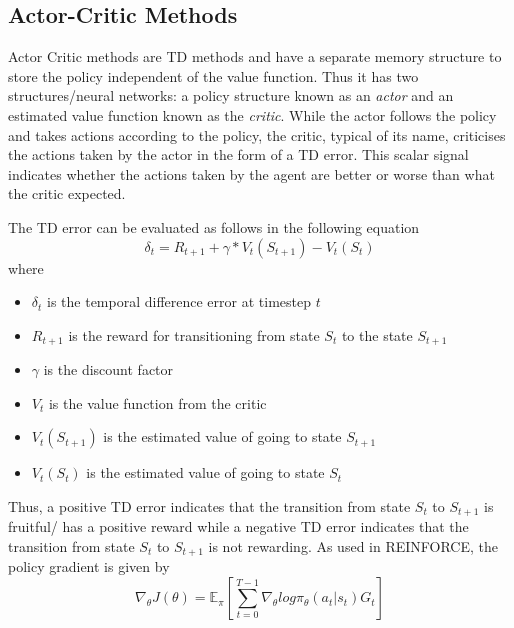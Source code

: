 \documentclass{article}
\begin{document}
\subsection{Actor-Critic Methods}
Actor Critic methods are TD methods and have a separate memory structure to store the policy independent of the value function. Thus it has two structures/neural networks: a policy structure known as an \emph{actor} and an estimated value function known as the \emph{critic}. While the actor follows the policy and takes actions according to the policy, the critic, typical of its name, criticises the actions taken by the actor in the form of a TD error. This scalar signal indicates whether the actions taken by the agent are better or worse than what the critic expected. 
\par The TD error can be evaluated as follows in the following equation
\begin{equation*}
\delta_{t} = R_{t+1} + \gamma * V_t(S_{t+1})-V_t(S_t)
\end{equation*}
 where 
\begin{itemize}[itemsep=0pt]
\renewcommand\labelitemi{.}
\item $\delta_{t}$ is the temporal difference error at timestep $t$
\item $R_{t+1}$ is the reward for transitioning from state $S_t$ to the state $S_{t+1}$
\item $\gamma$ is the discount factor
\item $V_{t}$ is the value function from the critic
\item $V_t(S_{t+1})$ is the estimated value of going to state $S_{t+1}$
\item $V_t(S_t)$ is the estimated value of going to state $S_t$
\end{itemize}
Thus, a positive TD error indicates that the transition from state $S_t$ to $S_{t+1}$ is fruitful/ has a positive reward while a negative TD error indicates that the transition from state $S_t$ to $S_{t+1}$ is not rewarding.
 \newline
\newline As used in REINFORCE, the policy gradient is given by 
\newline 
\begin{equation*}
\nabla_\theta J(\theta) = \mathbb{E}_\pi[\sum _{t=0}^{T-1} \nabla_\theta log\pi_\theta (a_t|s_t)G_t]
\end{equation*}
\end{document}
